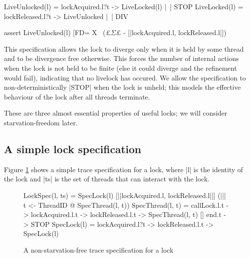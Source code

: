 \begin{cspm}
LiveUnlocked(l) =   lockAcquired.l?t -> LiveLocked(l)
                  |~| STOP
LiveLocked(l) =     lockReleased.l?t -> LiveUnlocked
                  |~| DIV

assert LiveUnlocked(l) [FD= X \ (£$\Sigma$£ - [|lockAcquired.l, lockReleased.l|])
\end{cspm}

This specification allows the lock to diverge only when it is held by some thread and to be divergence free otherwise. This forces the number of internal actions when the lock is not held to be finite (else it could diverge and the refinement would fail), indicating that no livelock has occured. We allow the specification to non-deterministically |STOP| when the lock is unheld; this models the effective behaviour of the lock after all threads terminate.


These are three almost essential properties of useful locks; we will consider starvation-freedom later.


\subsection{A simple lock specification} 

Figure \ref{code:LockSpec} shows a simple trace specification for a lock, where |l| is the identity of the lock and |ts| is the set of threads that can interact with the lock. 


\begin{figure}
\begin{cspm}
LockSpec(l, ts) = SpecLock(l) [|{|lockAcquired.l, lockReleased.l|}|]
                      (||| t <- ThreadID @ SpecThread(l, t))
SpecThread(l, t) =    
     callLock.l.t -> lockAcquired.l.t -> lockReleased.l.t -> SpecThread(l, t)
  [] end.t -> STOP
SpecLock(l) = lockAcquired.l?t -> lockReleased.l.t -> SpecLock(l)
\end{cspm}
\caption{A non-starvation-free trace specification for a lock}
\label{code:LockSpec}
\end{figure}

